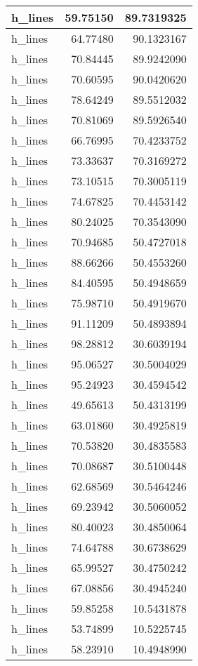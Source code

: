 \documentclass[
]{book}
\theoremstyle{definition}
\theoremstyle{definition}
\theoremstyle{definition}
\theoremstyle{definition}
\theoremstyle{remark}
\begin{document}
\begin{tabular}{l|r|r}
\hline
h\_lines & 59.75150 & 89.7319325\\
\hline
h\_lines & 64.77480 & 90.1323167\\
\hline
h\_lines & 70.84445 & 89.9242090\\
\hline
h\_lines & 70.60595 & 90.0420620\\
\hline
h\_lines & 78.64249 & 89.5512032\\
\hline
h\_lines & 70.81069 & 89.5926540\\
\hline
h\_lines & 66.76995 & 70.4233752\\
\hline
h\_lines & 73.33637 & 70.3169272\\
\hline
h\_lines & 73.10515 & 70.3005119\\
\hline
h\_lines & 74.67825 & 70.4453142\\
\hline
h\_lines & 80.24025 & 70.3543090\\
\hline
h\_lines & 70.94685 & 50.4727018\\
\hline
h\_lines & 88.66266 & 50.4553260\\
\hline
h\_lines & 84.40595 & 50.4948659\\
\hline
h\_lines & 75.98710 & 50.4919670\\
\hline
h\_lines & 91.11209 & 50.4893894\\
\hline
h\_lines & 98.28812 & 30.6039194\\
\hline
h\_lines & 95.06527 & 30.5004029\\
\hline
h\_lines & 95.24923 & 30.4594542\\
\hline
h\_lines & 49.65613 & 50.4313199\\
\hline
h\_lines & 63.01860 & 30.4925819\\
\hline
h\_lines & 70.53820 & 30.4835583\\
\hline
h\_lines & 70.08687 & 30.5100448\\
\hline
h\_lines & 62.68569 & 30.5464246\\
\hline
h\_lines & 69.23942 & 30.5060052\\
\hline
h\_lines & 80.40023 & 30.4850064\\
\hline
h\_lines & 74.64788 & 30.6738629\\
\hline
h\_lines & 65.99527 & 30.4750242\\
\hline
h\_lines & 67.08856 & 30.4945240\\
\hline
h\_lines & 59.85258 & 10.5431878\\
\hline
h\_lines & 53.74899 & 10.5225745\\
\hline
h\_lines & 58.23910 & 10.4948990\\

\end{tabular}
\end{document}
